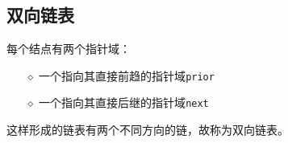 \subsection{双向链表}

\begin{frame}\ft{\subsecname}
\begin{dingyi}[双向链表]
每个结点有两个指针域：
\begin{itemize}
\item[$\diamond$]
一个指向其直接前趋的指针域{\tt prior}
\item[$\diamond$]
一个指向其直接后继的指针域{\tt next}
\end{itemize}
这样形成的链表有两个不同方向的链，故称为双向链表。
\end{dingyi}
\end{frame}

